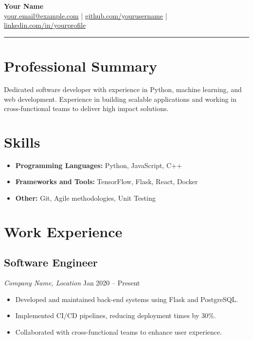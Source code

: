 \documentclass[a4paper,10pt]{article}
\begin{document}
\begin{center}
    {\Huge \textbf{Your Name}} \\[0.5em]
    \href{mailto:your.email@example.com}{your.email@example.com} | 
    \href{https://github.com/yourusername}{github.com/yourusername} | 
    \href{https://www.linkedin.com/in/yourprofile/}{linkedin.com/in/yourprofile}
\end{center}

\vspace{1em}
\hrule
\vspace{1em}

\section*{Professional Summary}
\color{graytext}
Dedicated software developer with experience in Python, machine learning, and web development. Experience in building scalable applications and working in cross-functional teams to deliver high impact solutions.

\section*{Skills}
\begin{itemize}[leftmargin=*]
    \item \textbf{Programming Languages:} Python, JavaScript, C++
    \item \textbf{Frameworks and Tools:} TensorFlow, Flask, React, Docker
    \item \textbf{Other:} Git, Agile methodologies, Unit Testing
\end{itemize}

\section*{Work Experience}

\subsection*{Software Engineer}
\textit{Company Name, Location} \hfill Jan 2020 -- Present
\begin{itemize}[leftmargin=*]
    \item Developed and maintained back-end systems using Flask and PostgreSQL.
    \item Implemented CI/CD pipelines, reducing deployment times by 30\%.
    \item Collaborated with cross-functional teams to enhance user experience.
\end{itemize}
\end{document}
